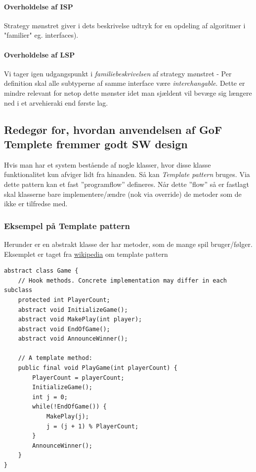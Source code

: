 \paragraph{Overholdelse af ISP}
Strategy mønstret giver i dets beskrivelse udtryk for en opdeling af algoritmer i "familier" eg. interfaces).

\paragraph{Overholdelse af LSP}
Vi tager igen udgangspunkt i \textit{familiebeskrivelsen} af strategy mønstret - Per definition skal alle subtyperne af samme interface være \textit{interchangable}. Dette er mindre relevant for netop dette mønster idet man sjældent vil bevæge sig længere ned i et arvehieraki end første lag.

\subsection{Redegør for, hvordan anvendelsen af GoF Templete fremmer godt SW design}
Hvis man har et system bestående af nogle klasser, hvor disse klasse funktionalitet kun afviger lidt fra hinanden. Så kan \textit{Template pattern} bruges. Via dette pattern kan et fast ''programflow'' defineres. Når dette ''flow'' så er fastlagt skal klasserne bare implementere/ændre (nok via override) de metoder som de ikke er tilfredse med.

\subsubsection{Eksempel på Template pattern}\label{sec:template}
Herunder er en abstrakt klasse der har metoder, som de mange spil bruger/følger. Eksemplet er taget fra \href{https://en.wikipedia.org/wiki/Template_method_pattern#Example_in_Java}{wikipedia} om template pattern

\begin{lstlisting}
abstract class Game {
	// Hook methods. Concrete implementation may differ in each subclass
	protected int PlayerCount;
	abstract void InitializeGame();
	abstract void MakePlay(int player);
	abstract void EndOfGame();
	abstract void AnnounceWinner();
	
	// A template method:
	public final void PlayGame(int playerCount)	{
		PlayerCount = playerCount;
		InitializeGame();
		int j = 0;
		while(!EndOfGame()) {
			MakePlay(j);
			j = (j + 1) % PlayerCount;
		}
		AnnounceWinner();
	}
}
\end{lstlisting}

